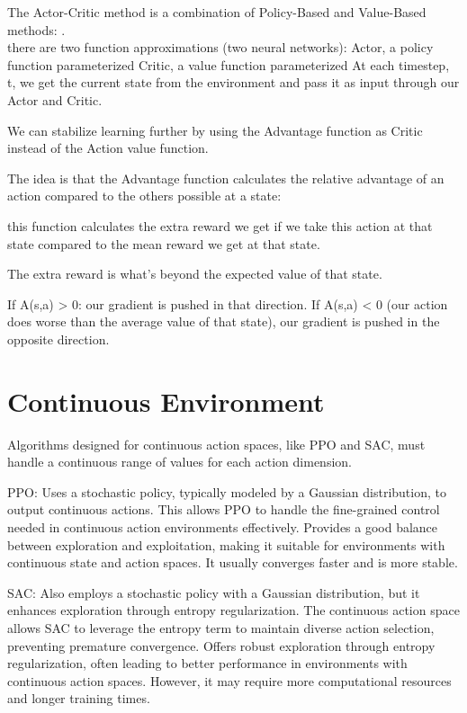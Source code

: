 \documentclass{article}
\begin{document}
The Actor-Critic method is a combination of Policy-Based and Value-Based methods: .\\
there are two function approximations (two neural networks):
Actor, a policy function parameterized 
Critic, a value function parameterized
At each timestep, t, we get the current state from the environment and pass it as input through our Actor and Critic.


We can stabilize learning further by using the Advantage function as Critic instead of the Action value function.

The idea is that the Advantage function calculates the relative advantage of an action compared to the others possible at a state: 

this function calculates the extra reward we get if we take this action at that state compared to the mean reward we get at that state.

The extra reward is what’s beyond the expected value of that state.

If A(s,a) > 0: our gradient is pushed in that direction.
If A(s,a) < 0 (our action does worse than the average value of that state), our gradient is pushed in the opposite direction.


\section{Continuous Environment}
Algorithms designed for continuous action spaces, like PPO and SAC, must handle a continuous range of values for each action dimension.

PPO: Uses a stochastic policy, typically modeled by a Gaussian distribution, to output continuous actions. This allows PPO to handle the fine-grained control needed in continuous action environments effectively. 
Provides a good balance between exploration and exploitation, making it suitable for environments with continuous state and action spaces. It usually converges faster and is more stable.


SAC: Also employs a stochastic policy with a Gaussian distribution, but it enhances exploration through entropy regularization. The continuous action space allows SAC to leverage the entropy term to maintain diverse action selection, preventing premature convergence.
Offers robust exploration through entropy regularization, often leading to better performance in environments with continuous action spaces. However, it may require more computational resources and longer training times.
\end{document}
